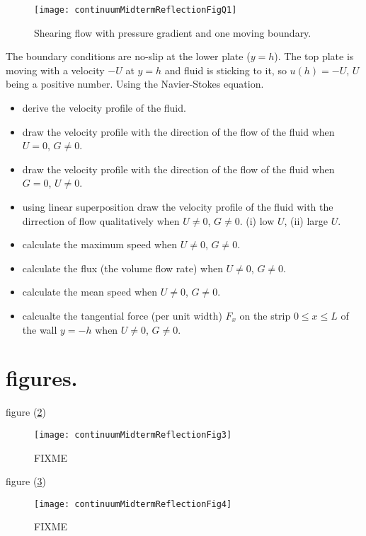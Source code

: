 \begin{figure}[htp]
   \centering
   \texttt{[image: continuumMidtermReflectionFigQ1]}
   \caption{Shearing flow with pressure gradient and one moving boundary.}\label{fig:continuumMidtermReflection:continuumMidtermReflectionFigQ1}
\end{figure}

The boundary conditions are no-slip at the lower plate ($y = h$).  The top plate is moving with a velocity $-U$ at $y = h$ and fluid is sticking to it, so $u(h) = -U$, $U$ being a positive number.  Using the Navier-Stokes equation.

\begin{itemize}
\item derive the velocity profile of the fluid.
\item draw the velocity profile with the direction of the flow of the fluid when $U = 0$, $G \ne 0$.
\item draw the velocity profile with the direction of the flow of the fluid when $G = 0$, $U \ne 0$.
\item using linear superposition draw the velocity profile of the fluid with the dirrection of flow qualitatively when $U \ne 0$, $G \ne 0$. (i) low $U$, (ii) large $U$.
\item calculate the maximum speed when $U \ne 0$, $G \ne 0$.
\item calculate the flux (the volume flow rate) when $U \ne 0$, $G \ne 0$.
\item calculate the mean speed when $U \ne 0$, $G \ne 0$.
\item calcualte the tangential force (per unit width) $F_x$ on the strip $0 \le x \le L$ of the wall $y = -h$ when $U \ne 0$, $G \ne 0$.
\end{itemize}

\section{figures.}

figure (\ref{fig:continuumMidtermReflection:continuumMidtermReflectionFig3})
\begin{figure}[htp]
   \centering
   \texttt{[image: continuumMidtermReflectionFig3]}
   \caption{FIXME}\label{fig:continuumMidtermReflection:continuumMidtermReflectionFig3}
\end{figure}
figure (\ref{fig:continuumMidtermReflection:continuumMidtermReflectionFig4})
\begin{figure}[htp]
   \centering
   \texttt{[image: continuumMidtermReflectionFig4]}
   \caption{FIXME}\label{fig:continuumMidtermReflection:continuumMidtermReflectionFig4}
\end{figure}

\EndArticle
